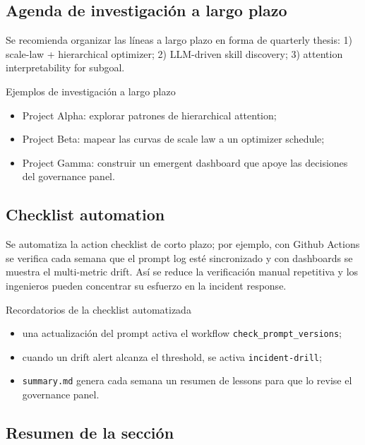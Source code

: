 \documentclass[a4paper]{article}
\begin{document}
\subsection{Agenda de investigación a largo plazo}

Se recomienda organizar las líneas a largo plazo en forma de quarterly thesis: 1) scale-law + hierarchical optimizer; 2) LLM-driven skill discovery; 3) attention interpretability for subgoal.

\begin{knowledgebox}{Ejemplos de investigación a largo plazo}
\begin{itemize}
    \item Project Alpha: explorar patrones de hierarchical attention;
    \item Project Beta: mapear las curvas de scale law a un optimizer schedule;
    \item Project Gamma: construir un emergent dashboard que apoye las decisiones del governance panel.
\end{itemize}
\end{knowledgebox}

\subsection{Checklist automation}

Se automatiza la action checklist de corto plazo; por ejemplo, con Github Actions se verifica cada semana que el prompt log esté sincronizado y con dashboards se muestra el multi-metric drift. Así se reduce la verificación manual repetitiva y los ingenieros pueden concentrar su esfuerzo en la incident response.

\begin{importantbox}{Recordatorios de la checklist automatizada}
\begin{itemize}
    \item una actualización del prompt activa el workflow \texttt{check\_prompt\_versions};
    \item cuando un drift alert alcanza el threshold, se activa \texttt{incident-drill};
    \item \texttt{summary.md} genera cada semana un resumen de lessons para que lo revise el governance panel.
\end{itemize}
\end{importantbox}

\subsection{Resumen de la sección}
\end{document}
